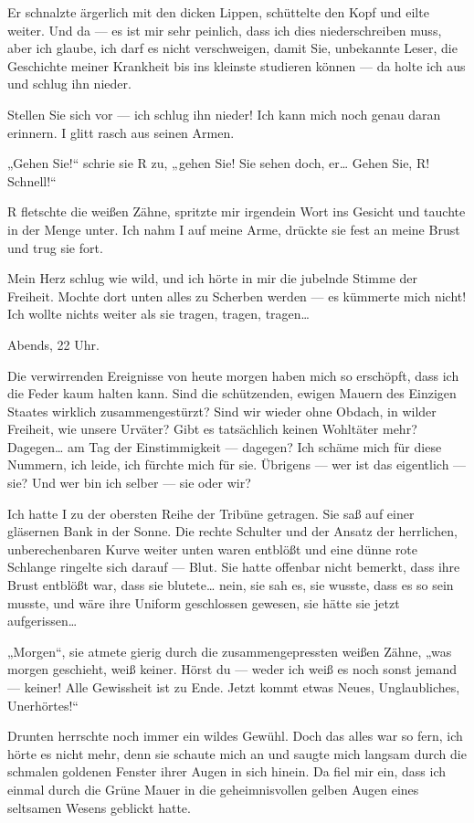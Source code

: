 Er schnalzte ärgerlich mit den dicken Lippen, schüttelte den Kopf
und eilte weiter. Und da — es ist mir sehr peinlich, dass ich dies
niederschreiben muss, aber ich glaube, ich darf es nicht
verschweigen, damit Sie, unbekannte Leser, die Geschichte meiner
Krankheit bis ins kleinste studieren können — da holte ich aus und
schlug ihn nieder.

Stellen Sie sich vor — ich schlug ihn nieder! Ich kann mich noch
genau daran erinnern. I glitt rasch aus seinen Armen.

„Gehen Sie!“ schrie sie R zu, „gehen Sie! Sie sehen doch, er\ldots{}
Gehen Sie, R! Schnell!“

R fletschte die weißen Zähne, spritzte mir irgendein Wort ins
Gesicht und tauchte in der Menge unter. Ich nahm I auf meine Arme,
drückte sie fest an meine Brust und trug sie fort.

Mein Herz schlug wie wild, und ich hörte in mir die jubelnde Stimme
der Freiheit. Mochte dort unten alles zu Scherben werden — es
kümmerte mich nicht! Ich wollte nichts weiter als sie tragen,
tragen, tragen\ldots{}

Abends, 22 Uhr.

Die verwirrenden Ereignisse von heute morgen haben mich so
erschöpft, dass ich die Feder kaum halten kann. Sind die
schützenden, ewigen Mauern des Einzigen Staates wirklich
zusammengestürzt? Sind wir wieder ohne Obdach, in wilder Freiheit,
wie unsere Urväter? Gibt es tatsächlich keinen Wohltäter mehr?
Dagegen\ldots{} am Tag der Einstimmigkeit — dagegen? Ich schäme mich für
diese Nummern, ich leide, ich fürchte mich für sie. Übrigens — wer
ist das eigentlich — sie? Und wer bin ich selber — sie oder wir?

Ich hatte I zu der obersten Reihe der Tribüne getragen. Sie saß auf
einer gläsernen Bank in der Sonne. Die rechte Schulter und der
Ansatz der herrlichen, unberechenbaren Kurve weiter unten waren
entblößt und eine dünne rote Schlange ringelte sich darauf — Blut.
Sie hatte offenbar nicht bemerkt, dass ihre Brust entblößt war,
dass sie blutete\ldots{} nein, sie sah es, sie wusste, dass es so sein
musste, und wäre ihre Uniform geschlossen gewesen, sie hätte sie
jetzt aufgerissen\ldots{}

„Morgen“, sie atmete gierig durch die zusammengepressten weißen
Zähne, „was morgen geschieht, weiß keiner. Hörst du — weder ich
weiß es noch sonst jemand — keiner! Alle Gewissheit ist zu Ende.
Jetzt kommt etwas Neues, Unglaubliches, Unerhörtes!“

Drunten herrschte noch immer ein wildes Gewühl. Doch das alles war
so fern, ich hörte es nicht mehr, denn sie schaute mich an und
saugte mich langsam durch die schmalen goldenen Fenster ihrer Augen
in sich hinein. Da fiel mir ein, dass ich einmal durch die Grüne
Mauer in die geheimnisvollen gelben Augen eines seltsamen Wesens
geblickt hatte.

